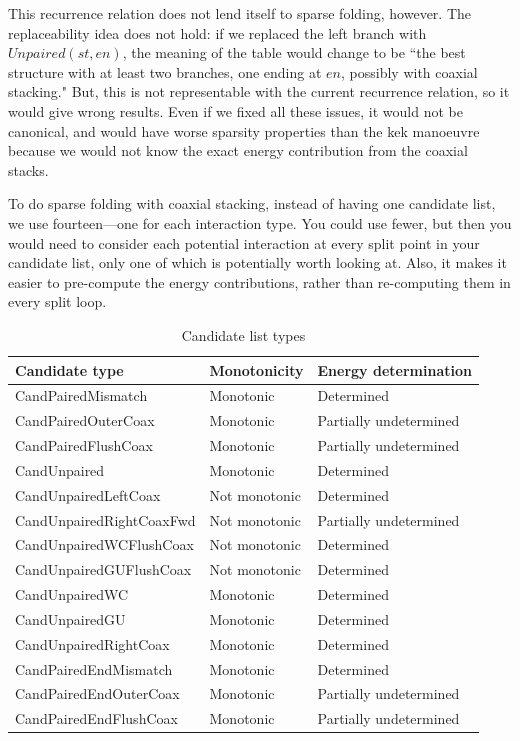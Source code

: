 \documentclass{cshonours}
\begin{document}
This recurrence relation does not lend itself to sparse folding, however. The replaceability idea does not hold: if we replaced the left branch with $Unpaired(st, en)$, the meaning of the table would change to be ``the best structure with at least two branches, one ending at $en$, possibly with coaxial stacking." But, this is not representable with the current recurrence relation, so it would give wrong results. Even if we fixed all these issues, it would not be canonical, and would have worse sparsity properties than the kek manoeuvre because we would not know the exact energy contribution from the coaxial stacks. 

To do sparse folding with coaxial stacking, instead of having one candidate list, we use fourteen---one for each interaction type. You could use fewer, but then you would need to consider each potential interaction at every split point in your candidate list, only one of which is potentially worth looking at. Also, it makes it easier to pre-compute the energy contributions, rather than re-computing them in every split loop.

\begin{table}
\begin{adjustbox}{center}
\begin{tabular}{lll}
Candidate type & Monotonicity & Energy determination \\
\hline
CandPairedMismatch & Monotonic & Determined \\
CandPairedOuterCoax & Monotonic & Partially undetermined \\
CandPairedFlushCoax & Monotonic & Partially undetermined \\
CandUnpaired & Monotonic & Determined \\
CandUnpairedLeftCoax & Not monotonic & Determined \\
CandUnpairedRightCoaxFwd & Not monotonic & Partially undetermined \\
CandUnpairedWCFlushCoax & Not monotonic & Determined \\
CandUnpairedGUFlushCoax & Not monotonic & Determined \\
CandUnpairedWC & Monotonic & Determined \\
CandUnpairedGU & Monotonic & Determined \\
CandUnpairedRightCoax & Monotonic & Determined \\
CandPairedEndMismatch & Monotonic & Determined \\
CandPairedEndOuterCoax & Monotonic & Partially undetermined \\
CandPairedEndFlushCoax & Monotonic &  Partially undetermined\\
\end{tabular}
\end{adjustbox}
\caption{Candidate list types}
\label{table:candidate_list_types}
\end{table}
\end{document}
